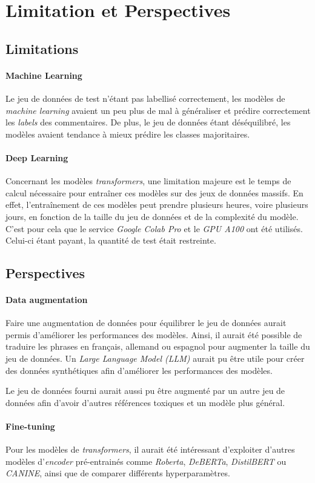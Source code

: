 \chapter{Limitation et Perspectives}

\section{Limitations}
\subsubsection{Machine Learning}
Le jeu de données de test n'étant pas labellisé correctement, les modèles de \textit{machine learning} avaient un peu plus de mal à généraliser et prédire correctement les \textit{labels} des commentaires.
 De plus, le jeu de données étant déséquilibré, les modèles avaient tendance à mieux prédire les classes majoritaires.

\subsubsection{Deep Learning}
Concernant les modèles \textit{transformers}, une limitation majeure est le temps de calcul nécessaire pour entraîner ces modèles sur des jeux de données massifs. 
En effet, l'entraînement de ces modèles peut prendre plusieurs heures, voire plusieurs jours, en fonction de la taille du jeu de données et de la complexité du modèle.
C'est pour cela que le service \textit{Google Colab Pro} et le \textit{GPU A100} ont été utilisés. Celui-ci étant payant, la quantité de test était restreinte.

\section{Perspectives}
\subsubsection{Data augmentation}
Faire une augmentation de données pour équilibrer le jeu de données aurait permis d'améliorer les performances des modèles.
Ainsi, il aurait été possible de traduire les phrases en français, allemand ou espagnol pour augmenter la taille du jeu de données.
Un \textit{Large Language Model (LLM)} aurait pu être utile pour créer des données synthétiques afin d'améliorer les performances des modèles. 

Le jeu de données fourni aurait aussi pu être augmenté par un autre jeu de données afin d'avoir d'autres références toxiques et un modèle plus général.

\subsubsection{Fine-tuning}
Pour les modèles de \textit{transformers}, il aurait été intéressant d'exploiter d'autres modèles d'\textit{encoder} pré-entrainés comme \textit{Roberta}, \textit{DeBERTa}, \textit{DistilBERT} ou \textit{CANINE}, ainsi que de comparer différents hyperparamètres.
